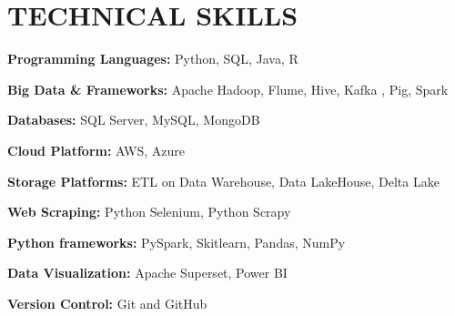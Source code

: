 \documentclass[letterpaper,11pt]{article}
\begin{document}
\section{\color{airforceblue}TECHNICAL SKILLS}
\begin{itemize}[leftmargin=0in, label={}]
\small{\item{
    \vspace{5pt}
    \textbf{\normalsize{Programming Languages:}}{ \normalsize{Python, SQL, Java, R}} \\
    \vspace{5pt}
    
    \textbf{\normalsize{Big Data \& Frameworks:}}{ \normalsize{Apache Hadoop, Flume, Hive, Kafka , Pig, Spark}} \\
    \vspace{5pt}
    
    \textbf{\normalsize{Databases:}}{ \normalsize{SQL Server, MySQL, MongoDB}}\\
    \vspace{5pt}

    \textbf{\normalsize{Cloud Platform:}}{ \normalsize{AWS, Azure}}\\
    \vspace{5pt}
    
    \textbf{\normalsize{Storage Platforms:}}{ \normalsize{ETL on Data Warehouse, Data LakeHouse, Delta Lake}}\\
    \vspace{5pt}

    \textbf{\normalsize{Web Scraping:}}{ \normalsize{Python Selenium, Python Scrapy}}\\
    \vspace{5pt}

    \textbf{\normalsize{Python frameworks:}}{ \normalsize{PySpark, Skitlearn, Pandas, NumPy}}\\
    \vspace{5pt}

    \textbf{\normalsize{Data Visualization:}}{ \normalsize{Apache Superset, Power BI}}\\
    \vspace{5pt}
    
    \textbf{\normalsize{Version Control:}}{ \normalsize{Git and GitHub}}\\
    \vspace{5pt}
    
     }}
 \end{itemize}
 \vspace{10pt}
 
\end{document}
